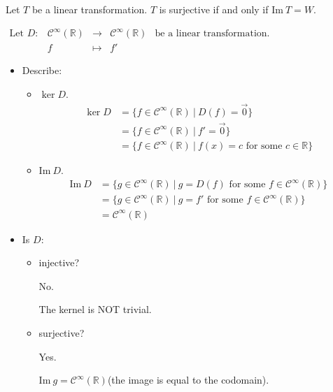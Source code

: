 \documentclass[11pt,fleqn]{book} %
\begin{document}
\begin{proposition}
    Let $T$ be a linear transformation. $T$ is surjective if and only if $\mathrm{Im}~T=W$. 
\end{proposition}
\setcounter{section}{2}

\begin{example}

    $\begin{matrix} \text{Let } D: &\mathcal{C}^\infty(\mathbb{R}) &\to &\mathcal{C}^\infty(\mathbb{R}) &\text{be a linear transformation.} \\ &f &\mapsto &f' \end{matrix}$

    \begin{itemize}
        \item Describe: 
        
        \begin{itemize}
            \item $\ker D$. 
            \begin{align*}
                \ker D 
                &= \{f\in \mathcal{C}^\infty(\mathbb{R}) ~|~D(f) = \overrightarrow{0} \}
                \\
                &= \{ f \in \mathcal{C}^\infty(\mathbb{R}) ~|~f'=\overrightarrow{0} \}
                \\
                &=\{ f \in \mathcal{C}^\infty(\mathbb{R}) ~|~ f(x) = c \text{ for some } c \in \mathbb{R}\}
            \end{align*}

            \item $\mathrm{Im}~D$. 
            \begin{align*}
                \mathrm{Im}~D
                &=\{ g \in \mathcal{C}^\infty(\mathbb{R}) ~|~g=D(f) \text{ for some }f \in \mathcal{C}^\infty(\mathbb{R}) \}
                \\  
                &=\{ g \in \mathcal{C}^\infty(\mathbb{R}) ~|~ g = f' \text{ for some } f \in \mathcal{C}^\infty(\mathbb{R}) \}
                \\
                &= \mathcal{C}^\infty(\mathbb{R})
            \end{align*}
        \end{itemize}
        
        \item Is $D$: 
        
        \begin{itemize}
            \item injective? 
            
            No. 
            
            The kernel is NOT trivial. 
            \item surjective?
            
            Yes. 
            
            $\mathrm{Im}~g=\mathcal{C}^\infty(\mathbb{R})$(the image is equal to the codomain). 
        \end{itemize}
    \end{itemize}
\end{example}
\end{document}
